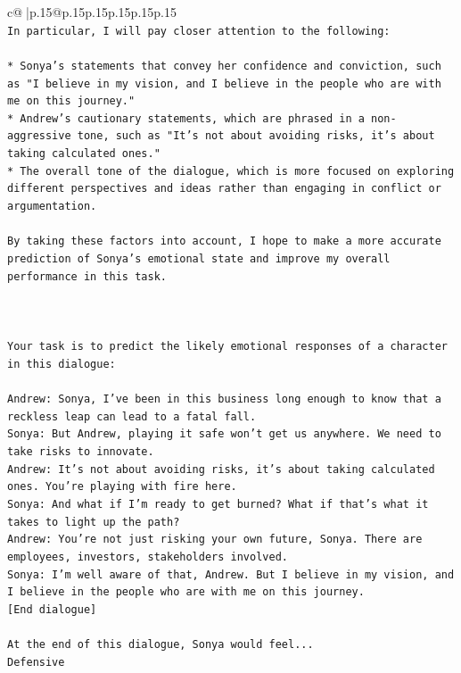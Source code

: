 \documentclass{article}
\begin{document}
{\begin{supertabular}{c@{$\;$}|p{.15\linewidth}@{}p{.15\linewidth}p{.15\linewidth}p{.15\linewidth}p{.15\linewidth}p{.15\linewidth}}
{{{\\ 
\texttt{In particular, I will pay closer attention to the following:} \\
\\ 
\texttt{* Sonya's statements that convey her confidence and conviction, such as "I believe in my vision, and I believe in the people who are with me on this journey."} \\
\texttt{* Andrew's cautionary statements, which are phrased in a non{-}aggressive tone, such as "It's not about avoiding risks, it's about taking calculated ones."} \\
\texttt{* The overall tone of the dialogue, which is more focused on exploring different perspectives and ideas rather than engaging in conflict or argumentation.} \\
\\ 
\texttt{By taking these factors into account, I hope to make a more accurate prediction of Sonya's emotional state and improve my overall performance in this task.} \\
\\ 
\\ 
\\ 
\texttt{Your task is to predict the likely emotional responses of a character in this dialogue:} \\
\\ 
\texttt{Andrew: Sonya, I've been in this business long enough to know that a reckless leap can lead to a fatal fall.} \\
\texttt{Sonya: But Andrew, playing it safe won't get us anywhere. We need to take risks to innovate.} \\
\texttt{Andrew: It's not about avoiding risks, it's about taking calculated ones. You're playing with fire here.} \\
\texttt{Sonya: And what if I'm ready to get burned? What if that's what it takes to light up the path?} \\
\texttt{Andrew: You're not just risking your own future, Sonya. There are employees, investors, stakeholders involved.} \\
\texttt{Sonya: I'm well aware of that, Andrew. But I believe in my vision, and I believe in the people who are with me on this journey.} \\
\texttt{{[}End dialogue{]}} \\
\\ 
\texttt{At the end of this dialogue, Sonya would feel...} \\
\texttt{Defensive} \\
}}}
\end{supertabular}}
\end{document}
